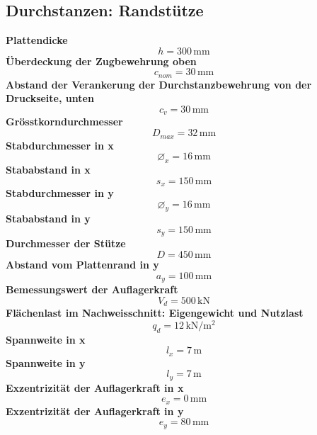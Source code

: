 \documentclass[11pt,a4paper]{article}
\begin{document}
\subsection{Durchstanzen: Randstütze}
\noindent\textbf{Plattendicke}
\begin{equation*}
h = 300\,\mathrm{mm}
\end{equation*}
\noindent\textbf{Überdeckung der Zugbewehrung oben}
\begin{equation*}
c_{nom} = 30\,\mathrm{mm}
\end{equation*}
\noindent\textbf{Abstand der Verankerung der Durchstanzbewehrung von der Druckseite, unten}
\begin{equation*}
c_v = 30\,\mathrm{mm}
\end{equation*}
\noindent\textbf{Grösstkorndurchmesser}
\begin{equation*}
D_{max} = 32\,\mathrm{mm}
\end{equation*}
\noindent\textbf{Stabdurchmesser in x}
\begin{equation*}
\varnothing_x = 16\,\mathrm{mm}
\end{equation*}
\noindent\textbf{Stababstand in x}
\begin{equation*}
s_x = 150\,\mathrm{mm}
\end{equation*}
\noindent\textbf{Stabdurchmesser in y}
\begin{equation*}
\varnothing_y = 16\,\mathrm{mm}
\end{equation*}
\noindent\textbf{Stababstand in y}
\begin{equation*}
s_y = 150\,\mathrm{mm}
\end{equation*}
\noindent\textbf{Durchmesser der Stütze}
\begin{equation*}
D = 450\,\mathrm{mm}
\end{equation*}
\noindent\textbf{Abstand vom Plattenrand in y}
\begin{equation*}
a_y = 100\,\mathrm{mm}
\end{equation*}
\noindent\textbf{Bemessungswert der Auflagerkraft}
\begin{equation*}
V_d = 500\,\mathrm{kN}
\end{equation*}
\noindent\textbf{Flächenlast im Nachweisschnitt: Eigengewicht und Nutzlast}
\begin{equation*}
q_d = 12\,\mathrm{kN}/\mathrm{m}^{2}
\end{equation*}
\noindent\textbf{Spannweite in x}
\begin{equation*}
l_x = 7\,\mathrm{m}
\end{equation*}
\noindent\textbf{Spannweite in y}
\begin{equation*}
l_y = 7\,\mathrm{m}
\end{equation*}
\noindent\textbf{Exzentrizität der Auflagerkraft in x}
\begin{equation*}
e_x = 0\,\mathrm{mm}
\end{equation*}
\noindent\textbf{Exzentrizität der Auflagerkraft in y}
\begin{equation*}
e_y = 80\,\mathrm{mm}
\end{equation*}
\end{document}

